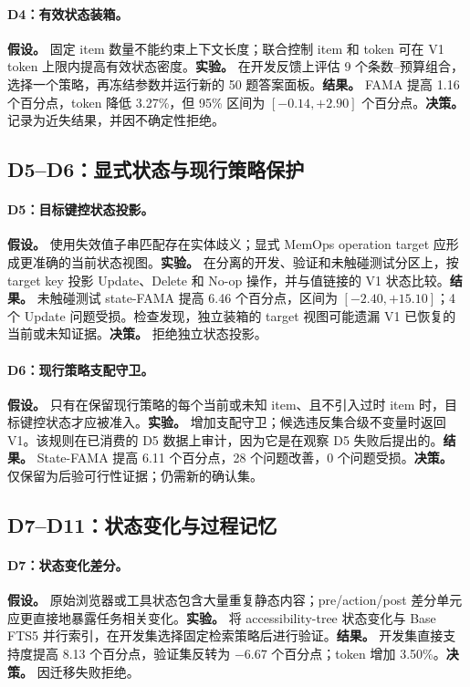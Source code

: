 \paragraph{D4：有效状态装箱。}
\textbf{假设。} 固定 item 数量不能约束上下文长度；联合控制 item 和 token 可在 V1 token 上限内提高有效状态密度。\textbf{实验。} 在开发反馈上评估 9 个条数--预算组合，选择一个策略，再冻结参数并运行新的 50 题答案面板。\textbf{结果。} FAMA 提高 1.16 个百分点，token 降低 3.27\%，但 95\% 区间为 $[-0.14,+2.90]$ 个百分点。\textbf{决策。} 记录为近失结果，并因不确定性拒绝。

\subsection{D5--D6：显式状态与现行策略保护}

\paragraph{D5：目标键控状态投影。}
\textbf{假设。} 使用失效值子串匹配存在实体歧义；显式 MemOps operation target 应形成更准确的当前状态视图。\textbf{实验。} 在分离的开发、验证和未触碰测试分区上，按 target key 投影 Update、Delete 和 No-op 操作，并与值链接的 V1 状态比较。\textbf{结果。} 未触碰测试 state-FAMA 提高 6.46 个百分点，区间为 $[-2.40,+15.10]$；4 个 Update 问题受损。检查发现，独立装箱的 target 视图可能遗漏 V1 已恢复的当前或未知证据。\textbf{决策。} 拒绝独立状态投影。

\paragraph{D6：现行策略支配守卫。}
\textbf{假设。} 只有在保留现行策略的每个当前或未知 item、且不引入过时 item 时，目标键控状态才应被准入。\textbf{实验。} 增加支配守卫；候选违反集合级不变量时返回 V1。该规则在已消费的 D5 数据上审计，因为它是在观察 D5 失败后提出的。\textbf{结果。} State-FAMA 提高 6.11 个百分点，28 个问题改善，0 个问题受损。\textbf{决策。} 仅保留为后验可行性证据；仍需新的确认集。

\subsection{D7--D11：状态变化与过程记忆}

\paragraph{D7：状态变化差分。}
\textbf{假设。} 原始浏览器或工具状态包含大量重复静态内容；pre/action/post 差分单元应更直接地暴露任务相关变化。\textbf{实验。} 将 accessibility-tree 状态变化与 Base FTS5 并行索引，在开发集选择固定检索策略后进行验证。\textbf{结果。} 开发集直接支持度提高 8.13 个百分点，验证集反转为 $-6.67$ 个百分点；token 增加 3.50\%。\textbf{决策。} 因迁移失败拒绝。

